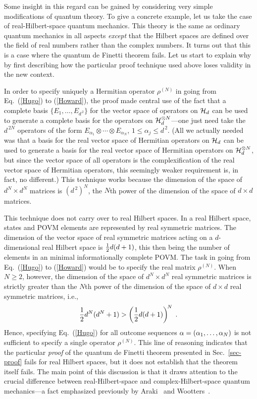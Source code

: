 \documentclass[12pt,aps,eqsecnum]{revtex4-1}
\begin{document}
Some insight in this regard can be gained by considering very
simple modifications of quantum theory.  To give a concrete
example, let us take the case of real-Hilbert-space quantum
mechanics.  This theory is the same as ordinary quantum mechanics
in all aspects {\it except\/} that the Hilbert spaces are defined
over the field of real numbers rather than the complex numbers.
It turns out that this is a case where the quantum de Finetti
theorem fails.  Let us start to explain why by first describing
how the particular proof technique used above loses validity in
the new context.

In order to specify uniquely a Hermitian operator $\rho^{(N)}$ in
going from Eq.~(\ref{Hugo}) to (\ref{Howard}), the proof made
central use of the fact that a complete basis
$\{E_{1},\ldots,E_{d^{\,2}}\}$ for the vector space of operators
on ${\cal H}_d$ can be used to generate a complete basis for the
operators on ${\cal H}_d^{\otimes N}$---one just need take the
$d^{\,2N}$ operators of the form
$E_{\alpha_1}\!\otimes\cdots\otimes E_{\alpha_N}$,
$1\le\alpha_j\le d^{\,2}$.  (All we actually needed was that a
basis for the real vector space of Hermitian operators on ${\cal
H}_d$ can be used to generate a basis for the real vector space of
Hermitian operators on ${\cal H}_d^{\otimes N}$, but since the
vector space of all operators is the complexification of the real
vector space of Hermitian operators, this seemingly weaker
requirement is, in fact, no different.)  This technique works
because the dimension of the space of $d^N\!\times d^N$ matrices
is $(d^{\,2})^N$, the $N$th power of the dimension of the space
of $d\times d$ matrices.

This technique does not carry over to real Hilbert spaces. In a
real Hilbert space, states and POVM elements are represented by
real symmetric matrices.  The dimension of the vector space of
real symmetric matrices acting on a $d$-dimensional real Hilbert
space is ${1\over2}d(d+1)$, this then being the number of elements
in an minimal informationally complete POVM.  The task in going
from Eq.~(\ref{Hugo}) to (\ref{Howard}) would be to specify the
real matrix $\rho^{(N)}$.  When $N\ge2$, however, the dimension of
the space of $d^N\!\times d^N$ real symmetric matrices is strictly
greater than the $N$th power of the dimension of the space of
$d\times d$ real symmetric matrices, i.e.,
\begin{equation}
{1\over2}d^{N}(d^N+1)>\left({1\over2}d(d+1)\right)^{\! N}\;.
\end{equation}
Hence, specifying Eq.~(\ref{Hugo}) for all outcome sequences
$\relax{\alpha}=(\alpha_1,\ldots,\alpha_N)$ is not sufficient to
specify a single operator $\rho^{(N)}$.  This line of reasoning
indicates that the particular {\it proof\/} of the quantum de
Finetti theorem presented in Sec.~\ref{sec-proof} fails for real
Hilbert spaces, but it does not establish that the theorem itself
fails.  The main point of this discussion is that it draws
attention to the crucial difference between real-Hilbert-space and
complex-Hilbert-space quantum mechanics---a fact emphasized
previously by Araki~\cite{Araki1980} and
Wootters~\cite{Wootters1990}.
\end{document}
